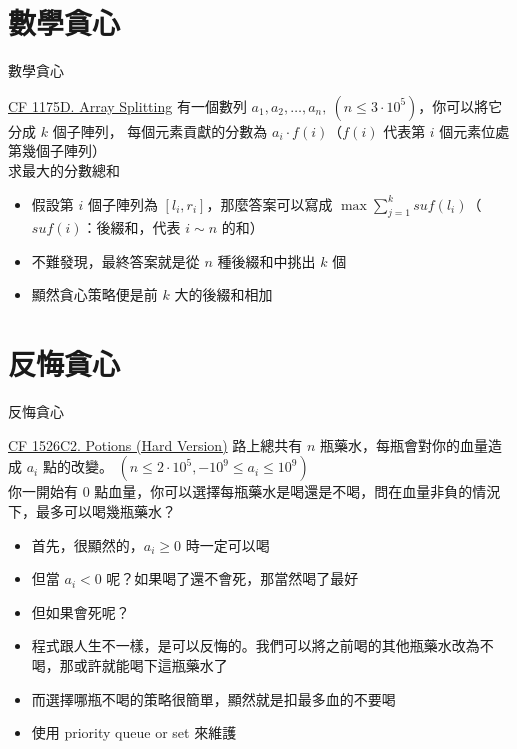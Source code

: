 \documentclass[aspectratio=169]{beamer}
\begin{document}
    \section{數學貪心}
    
    \begin{frame}{數學貪心}
        \begin{block}{\href{https://codeforces.com/problemset/problem/1175/D}{CF 1175D. Array Splitting}}
            有一個數列 $a_1, a_2, \dots, a_n,\ (n \le 3 \cdot 10^5)$，你可以將它分成 $k$ 個子陣列，
            每個元素貢獻的分數為 $a_i \cdot f(i)$（$f(i)$ 代表第 $i$ 個元素位處第幾個子陣列）\\
            求最大的分數總和
        \end{block}

        \begin{itemize}
            \item<1-> 假設第 $i$ 個子陣列為 $[l_i, r_i]$，那麼答案可以寫成 $\max\sum_{j = 1}^{k}{suf(l_i)}$（$suf(i)$：後綴和，代表 $i \sim n$ 的和）
            \item<2-> 不難發現，最終答案就是從 $n$ 種後綴和中挑出 $k$ 個
            \item<3-> 顯然貪心策略便是前 $k$ 大的後綴和相加
        \end{itemize}
    \end{frame}

    \section{反悔貪心}

    \begin{frame}{反悔貪心}
        \begin{block}{\href{https://codeforces.com/problemset/problem/1526/C2}{CF 1526C2. Potions (Hard Version)}}
            路上總共有 $n$ 瓶藥水，每瓶會對你的血量造成 $a_i$ 點的改變。 $(n \le 2 \cdot 10^5, -10^9 \le a_i \le 10^9)$\\
            你一開始有 $0$ 點血量，你可以選擇每瓶藥水是喝還是不喝，問在血量非負的情況下，最多可以喝幾瓶藥水？
        \end{block}

        \begin{itemize}
            \item<1-> 首先，很顯然的，$a_i \ge 0$ 時一定可以喝
            \item<2-> 但當 $a_i < 0$ 呢？如果喝了還不會死，那當然喝了最好
            \item<3-> 但如果會死呢？
            \item<4-> 程式跟人生不一樣，是可以反悔的。我們可以將之前喝的其他瓶藥水改為不喝，那或許就能喝下這瓶藥水了
            \item<5-> 而選擇哪瓶不喝的策略很簡單，顯然就是扣最多血的不要喝
            \item<6-> 使用 priority queue or set 來維護
        \end{itemize}
    \end{frame}
\end{document}
